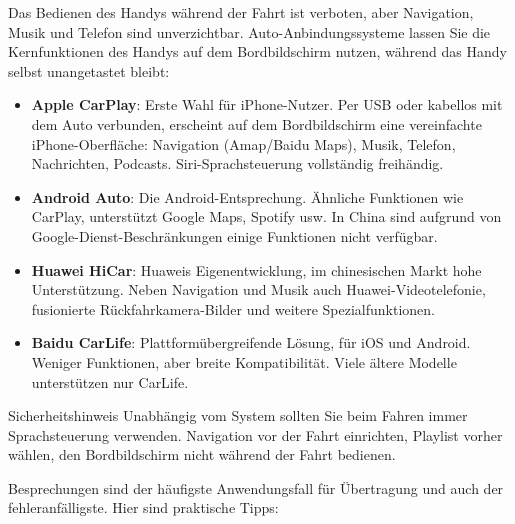 
Das Bedienen des Handys während der Fahrt ist verboten, aber Navigation, Musik und Telefon sind unverzichtbar. Auto-Anbindungssysteme lassen Sie die Kernfunktionen des Handys auf dem Bordbildschirm nutzen, während das Handy selbst unangetastet bleibt:

\begin{itemize}
  \item \textbf{Apple CarPlay}: Erste Wahl für iPhone-Nutzer. Per USB oder kabellos mit dem Auto verbunden, erscheint auf dem Bordbildschirm eine vereinfachte iPhone-Oberfläche: Navigation (Amap/Baidu Maps), Musik, Telefon, Nachrichten, Podcasts. Siri-Sprachsteuerung vollständig freihändig.
  \item \textbf{Android Auto}: Die Android-Entsprechung. Ähnliche Funktionen wie CarPlay, unterstützt Google Maps, Spotify usw. In China sind aufgrund von Google-Dienst-Beschränkungen einige Funktionen nicht verfügbar.
  \item \textbf{Huawei HiCar}: Huaweis Eigenentwicklung, im chinesischen Markt hohe Unterstützung. Neben Navigation und Musik auch Huawei-Videotelefonie, fusionierte Rückfahrkamera-Bilder und weitere Spezialfunktionen.
  \item \textbf{Baidu CarLife}: Plattformübergreifende Lösung, für iOS und Android. Weniger Funktionen, aber breite Kompatibilität. Viele ältere Modelle unterstützen nur CarLife.
\end{itemize}

\begin{tcbwarn}{Sicherheitshinweis}
Unabhängig vom System sollten Sie beim Fahren immer Sprachsteuerung verwenden. Navigation vor der Fahrt einrichten, Playlist vorher wählen, den Bordbildschirm nicht während der Fahrt bedienen.

\end{tcbwarn}


Besprechungen sind der häufigste Anwendungsfall für Übertragung und auch der fehleranfälligste. Hier sind praktische Tipps:

